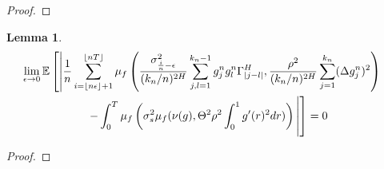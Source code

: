 \documentclass[12pt,letterpaper]{article}
\newtheorem{lemma}{Lemma}
\theoremstyle{definition}
\newcommand{\E}{\mathbb{E}}
\begin{document}
\begin{proof}

\end{proof}

\begin{lemma}
  \begin{align}
    \phantom{}
    &\begin{aligned}
      \mathllap{} &\lim_{\epsilon \rightarrow 0}\E\left[ \left| \frac{1}{n}\sum_{i = \left\lfloor n\epsilon \right\rfloor + 1}^{\left\lfloor nT \right\rfloor}\mu_f\left( \frac{\sigma^2_{\frac{i}{n}-\epsilon}}{(k_n/n)^{2H}}\sum_{j,l = 1}^{k_n-1} g^n_jg^n_l\Gamma^H_{|j-l|}, \frac{\rho^2}{(k_n/n)^{2H}}\sum_{j=1}^{k_n}(\Delta g^n_j)^2 \right) \right.\right. \\
                  &\hspace*{2cm} \left.\left. - \int_0^T\mu_f\left(\sigma_{s}^2\mu_f(\nu(g), \Theta^2\rho^2\int_0^1g'(r)^2dr)\right) \vphantom{\E\left[ \left| \frac{1}{n}\sum_{i = \left\lfloor n\epsilon \right\rfloor + 1}^{\left\lfloor nT \right\rfloor}\mu_f\left( \frac{\sigma^2_{\frac{i}{n}-\epsilon}}{(k_n/n)^{2H}}\sum_{j,l = 1}^{k_n-1} g^n_jg^n_l\Gamma^H_{|j-l|}, \frac{\rho^2}{(k_n/n)^{2H}}\sum_{j=1}^{k_n}(\Delta g^n_j)^2 \right) \right.\right.} \right|\right] = 0
      \end{aligned}
  \end{align}
\end{lemma}

\begin{proof}

\end{proof}
\end{document}
